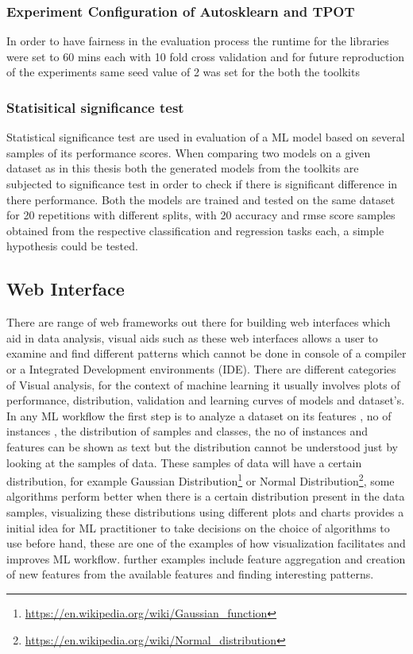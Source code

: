     
\subsubsection{Experiment Configuration of Autosklearn and TPOT}
In order to have fairness in the evaluation process the runtime for the libraries were set to 60 mins each with 10 fold cross validation and for future reproduction of the experiments same seed value of 2 was set for the both the toolkits
   
    
\subsubsection{Statisitical significance test}
Statistical significance test are used in evaluation of a ML model based on several samples of its performance scores. When comparing two models on a given dataset as in this thesis both the generated models from the toolkits are subjected to significance test in order to check if there is significant difference in there performance. Both the models are trained and tested on the same dataset for 20 repetitions with different splits, with 20 accuracy and rmse score samples obtained from the respective classification and regression tasks each, a simple hypothesis could be tested.
  
    
\subsection{Web Interface}
There are range of web frameworks out there for building web interfaces which aid in data analysis, visual aids such as these web interfaces allows a user to examine and find different patterns which cannot be done in console of a compiler or a Integrated Development environments (IDE). There are different categories of Visual analysis, for the context of machine learning it usually involves plots of performance, distribution, validation and learning curves of models and dataset's. In any ML workflow the first step is to analyze a dataset on its features , no of instances , the distribution of samples and classes, the no of instances and features can be shown as text but the distribution cannot be understood just by looking at the samples of data. These samples of data  will have a certain distribution, for example Gaussian Distribution\footnote{\url{https://en.wikipedia.org/wiki/Gaussian_function}} or Normal Distribution\footnote{\url{https://en.wikipedia.org/wiki/Normal_distribution}}, some algorithms perform better when there is a certain distribution present in the data samples, visualizing these distributions using different plots and charts provides a initial idea for ML practitioner to take decisions on the choice of algorithms to use before hand, these are one of the examples of how visualization facilitates and improves ML workflow. further examples include feature aggregation and creation of new features from the available features and finding interesting patterns.


